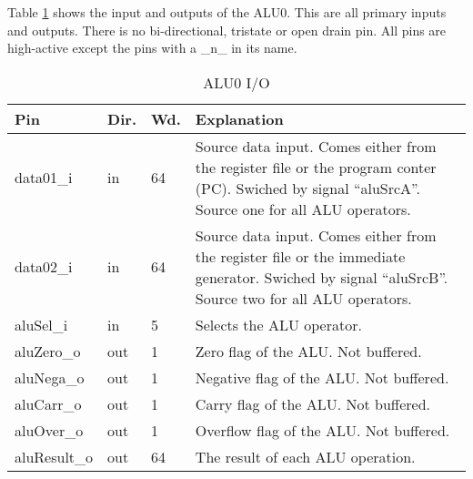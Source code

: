 Table \ref{tab:asAlu01} shows the input and outputs of the ALU0. This are all primary inputs and outputs. There is no bi-directional, tristate or open drain pin. All pins are high-active except the pins with a \_n\_ in its name.
\begin{table}[H]
\caption{ALU0 I/O}
\label{tab:asAlu01}
\centering
\begin{tabularx}{\textwidth}{|l |l |l |X|}
  \hline
  Pin & Dir. & Wd. & Explanation \\
  \hline
  \hline
  data01\_i & in & 64 & Source data input. Comes either from the register file or the program conter (PC). Swiched by signal ``aluSrcA''. Source one for all ALU operators. \\
  \hline
  data02\_i & in & 64 & Source data input. Comes either from the register file or the immediate generator. Swiched by signal ``aluSrcB''. Source two for all ALU operators. \\
  \hline
  aluSel\_i & in & 5 & Selects the ALU operator. \\
  \hline
  aluZero\_o & out & 1 & Zero flag of the ALU. Not buffered. \\
  \hline
  aluNega\_o & out & 1 & Negative flag of the ALU. Not buffered. \\
  \hline
  aluCarr\_o & out & 1 & Carry flag of the ALU. Not buffered. \\
  \hline
  aluOver\_o & out & 1 & Overflow flag of the ALU. Not buffered. \\
  \hline
  aluResult\_o & out & 64 & The result of each ALU operation.  \\
  \hline
\end{tabularx}
\end{table}
